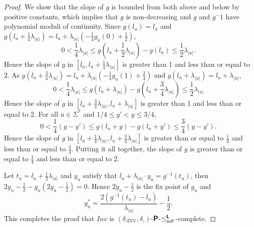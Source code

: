 \documentclass[envcountsect,envcountsame,orivec,oribibl]{llncs}
\newcommand{\classtwofont}[1]{\text{\bfseries \sffamily \upshape #1}}
\newcommand{\classLtwo}{\classtwofont{L}}
\newcommand{\classPtwo}{\classtwofont{P}}
\newcommand{\deltabox}{\delta _\square}
\newcommand{\deltaboxINV}{\delta _{\square \mathrm{INV}}}
\newcommand{\redmF}{\leq _{\mathrm{mF}}}
\newcommand{\redLmF}{\redmF ^{\classLtwo}}
\newcommand{\OpINV}{\mathit{Inv}}
\begin{document}
\begin{proof}
We show that the slope of $g$ is bounded from both above and below
by positive constants, which implies that $g$ is non-decreasing and 
$g$ and $g^-1$ have polynomial moduli of continuity.
Since $g(l_u)=l_u$ and 
$g(l_u+\frac{1}{4}\lambda_{|u|}) = l_u + \lambda_{|u|}(-\frac{1}{4}g_u(0) + \frac{1}{2})$,
\begin{equation}
 0 < \frac{1}{4}\lambda_{|u|}
 \le g \left( l_u+ \frac{1}{2} \lambda_{|u|} \right) - g(l_u)
 \le \frac{1}{2}\lambda_{|u|}.
\end{equation}
Hence the slope of $g$ in $[l_u, l_u + \frac{1}{4}\lambda_{|u|}]$ is 
greater than 1 and less than or equal to 2.
As $g(l_u+\frac{3}{4}\lambda_{|u|}) = l_u + \lambda_{|u|}(-\frac{1}{4}g_u(1) + \frac{3}{4})$ and
$g(l_u+\lambda_{|u|}) = l_u+\lambda_{|u|}$,
\begin{equation}
 0 < \frac{1}{4}\lambda_{|u|}
 \le g(l_u+\lambda_{|u|}) - g \left(l_u+ \frac 3 4 \lambda_{|u|} \right)
 \le \frac{1}{2}\lambda_{|u|}
\end{equation}
Hence the slope of $g$ in $[l_u + \frac{3}{4}\lambda_{|u|}, l_u + \lambda_{|u|}]$ is greater than 1 and less than or equal to 2.
For all $u \in \varSigma^*$ and $1/4 \le y' < y \le 3/4$,
\begin{equation}
0 < \frac{1}{4}(y - y') \le g(l_u+y) - g(l_u+y') \le \frac{3}{4}(y - y').
\end{equation}
Hence the slope of $g$ in $[l_u + \frac{1}{4}\lambda_{|u|}, l_u + \frac{3}{4}\lambda_{|u|}]$ 
is greater than or equal to $\frac{1}{4}$ and less than or equal to $\frac{3}{4}$.
Putting it all together, the slope of $g$ is greater than or equal to $\frac{1}{4}$ and less than or equal to $2$.

Let $t_u = l_u + \frac{1}{2}\lambda_{|u|}$ and $y_u$ satisfy that 
$l_u + \lambda_{|u|} \cdot y_u = g^{-1}(t_u)$, then
$2y_u - \frac{1}{2} - g_u (2y_u - \frac{1}{2}) = 0$.
Hence $2y_u - \frac{1}{2}$ is the fix point of $g_u$ and 
\begin{equation}
 y^*_u = \frac{2\left( g^{-1}(t_u) - l_u \right)}{\lambda_{|u|}} - \frac{1}{2}.
\end{equation}
This completes the proof that $\OpINV$ is $(\deltaboxINV, \deltabox)$-$\classPtwo$-$\redLmF$-complete.
\end{proof}
\end{document}
